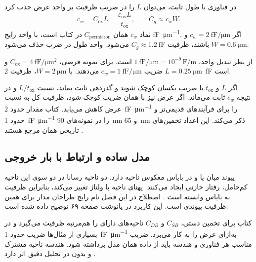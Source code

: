 در فناوری با طول ثابت، می‌توان \(L\) را در ضریب ظرفیت بر واحد عرض جذب کرد
\begin{equation}
 c_w=C_{\mathrm{ox}}L
 =\frac{\varepsilon_{\mathrm{ox}}L}{t_{\mathrm{ox}}},\qquad C_g\approx c_wW.
 \label{eq:cv-width-coefficient}
\end{equation}
نماد \(c_w\) همان \(C_{\mathrm{permicron}}\) در کتاب است، با واحد رایج
\unit{\femto\farad\per\micro\metre}.
اگر \(c_w=\qty{2}{\femto\farad\per\micro\metre}\) و
\(W=\qty{0.6}{\micro\metre}\) باشند، ظرفیت \(C_g\approx\qty{1.2}{\femto\farad}\)
می‌شود. واحد طول در ضرب حذف می‌شود.

از نظر تبدیل واحد، \(\qty{1}{\femto\farad\per\micro\metre}=10^{-9}\,
\unit{\farad\per\metre}\) است. برای نمونه فرضی،
\(C_{\mathrm{ox}}=\qty{4}{\femto\farad\per\micro\metre\squared}\) و
\(L=\qty{0.25}{\micro\metre}\) ضریب \(c_w=\qty{1}{\femto\farad\per\micro\metre}\)
می‌دهند. با \(W=\qty{2}{\micro\metre}\)، ظرفیت \qty{2}{\femto\farad} است.

اگر \(L\) و \(t_{\mathrm{ox}}\) با ضریب یکسان کوچک شوند و گذردهی ثابت بماند،
نسبت \(L/t_{\mathrm{ox}}\) و در نتیجه \(c_w\) ثابت می‌ماند.
اگر عرض نیز با همان ضریب کوچک شود، ظرفیت کل به نسبت عرض کاهش می‌یابد.
کتاب مقدار حدود \qty{2}{\femto\farad\per\micro\metre} را برای فرآیندهای
قدیمی‌تر و حدود \qty{1}{\femto\farad\per\micro\metre} را در نمونه‌های
\qty{90}{\nano\metre} و \qty{65}{\nano\metre} ذکر می‌کند.
این اعداد تخمین‌های تاریخی همان مرجع هستند \cite[روابط  و ]{weste}.

\subsection{مدل ساده  و ارتباط با بار خروجی}
پیوند  میان  یا  و  در بایاس معکوس
ناحیه  دارد. دو ناحیه رسانا در دو سوی این ناحیه کم‌حامل، رفتار
خازنی ایجاد می‌کنند. پهنای ناحیه با ولتاژ تغییر می‌کند، بنابراین ظرفیت به بایاس
وابسته است \cite[اسلاید ۲۳ و صفحه ۶۹]{mos,weste}.
اصطلاح  در این فصل نام رایج طراحان مدار برای همین
ظرفیت پیوندی  است. این کاربرد در پانوشت صفحه ۶۹ توضیح داده شده است.

کتاب برای تخمین دستی، \(C_{SB}\) و \(C_{DB}\) ناحیه‌های دارای 
را هم‌مرتبه ظرفیت  می‌گیرد و در بسیاری از مثال‌ها ضریب حدود
\qty{1}{\femto\farad\per\micro\metre} به‌ازای عرض را به کار می‌برد.
ضریب مناسب هر فناوری و هندسه باید از داده همان مدل برداشته شود.
هندسه ناحیه مشترک و بدون  در تحلیل دقیق اثر دارد
\cite[صفحه ۷۰]{weste}.

